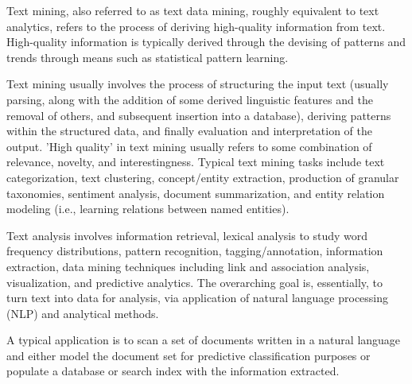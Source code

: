 Text mining, also referred to as text data mining, roughly equivalent to text analytics, refers to the process of deriving high-quality information from text. High-quality information is typically derived through the devising of patterns and trends through means such as statistical pattern learning. 

Text mining usually involves the process of structuring the input text (usually parsing, along with the addition of some derived linguistic features and the removal of others, and subsequent insertion into a database), deriving patterns within the structured data, and finally evaluation and interpretation of the output. 'High quality' in text mining usually refers to some combination of relevance, novelty, and interestingness. Typical text mining tasks include text categorization, text clustering, concept/entity extraction, production of granular taxonomies, sentiment analysis, document summarization, and entity relation modeling (i.e., learning relations between named entities).

Text analysis involves information retrieval, lexical analysis to study word frequency distributions, pattern recognition, tagging/annotation, information extraction, data mining techniques including link and association analysis, visualization, and predictive analytics. The overarching goal is, essentially, to turn text into data for analysis, via application of natural language processing (NLP) and analytical methods.

A typical application is to scan a set of documents written in a natural language and either model the document set for predictive classification purposes or populate a database or search index with the information extracted.
